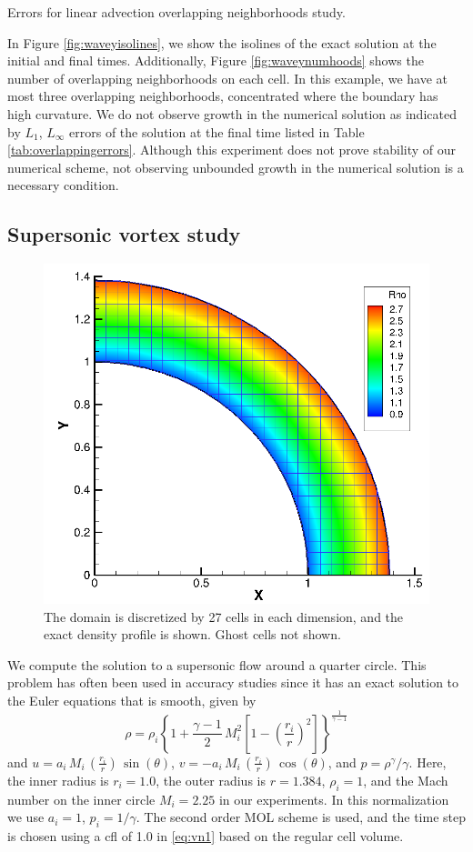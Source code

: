 {\begin{table}[h]
\caption{Errors for linear advection overlapping neighborhoods study.} \label{tab:overlappingerrors}
\end{table}

In Figure \ref{fig:waveyisolines}, we show the isolines of the exact solution 
at the initial and final times.  Additionally, Figure \ref{fig:waveynumhoods} 
shows the number of overlapping neighborhoods on each cell.  In this example, 
we have at most three overlapping neighborhoods,  concentrated where the 
boundary has high curvature.   We do not observe growth in the numerical 
solution as indicated by $L_1$, $L_\infty$ errors of the solution at the final 
time listed in Table \ref{tab:overlappingerrors}.  Although this experiment does 
not prove stability of our numerical scheme, not observing unbounded growth in the numerical solution is a necessary condition.
}

\subsection{Supersonic vortex study}\label{sec:ssv}

\begin{figure}
\centering
\vspace*{-.2in}
\includegraphics[height=0.45\textwidth]{figs/ssvIllustration.png}
\caption{\sf The domain is discretized by 27 cells in each dimension, and
the exact density profile is shown. Ghost cells not shown.
\label{fig:ssvFig}}
\end{figure}

We compute the solution to a supersonic flow 
around a quarter circle.  This problem has often been used in accuracy 
studies \cite{aftosmis:acc} since it has an exact solution to the Euler
equations that is smooth, given by 
\begin{equation}
\rho = \rho_i \left \{ 1 + \frac{\gamma-1}{2} \, M_i^2 \left [ 1 - (\frac{r_i}{r})^2
\right ] \right \} ^
{\frac{1}{\gamma-1}}
\end{equation}
and $ u = a_i \, M_i \, (\frac{r_i}{r})\,  \sin (\theta)$, 
$ v = -a_i\,  M_i\,  (\frac{r_i}{r})\,  \cos(\theta)$, and
$ p = \rho^\gamma / \gamma$.
Here, the inner radius is $r_i = 1.0$,  the outer radius
is $r = 1.384$, $\rho_i=1$, and the Mach number on the inner circle
$M_i = 2.25$ in our experiments. 
In this
normalization we use $a_i = 1$, $p_i = 1/\gamma$. 
The second order MOL scheme is used, 
and the time step is chosen using a cfl of 1.0 in \eqref{eq:vn1}
based on the regular cell volume.


